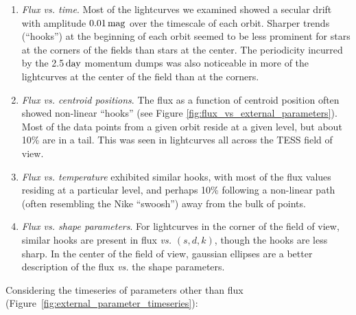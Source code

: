 \documentclass[12pt,twocolumn,tighten]{aastex62}
\begin{document}
\begin{enumerate}

\item {\it Flux vs. time}. Most of the lightcurves we examined showed a secular
    drift with amplitude $0.01\,{\rm mag}$ over the timescale of each
    orbit.  Sharper trends (``hooks'') at the beginning of each orbit
    seemed to be less prominent for stars at the corners of the fields
    than stars at the center.  The periodicity incurred by the
    2.5$\,{\rm day}$ momentum dumps was also noticeable in more of the
    lightcurves at the center of the field than at the corners.

\item {\it Flux vs. centroid positions}. The flux as a function of
  centroid position often showed non-linear ``hooks'' (see Figure
    \ref{fig:flux_vs_external_parameters}). Most of the data points from a 
    given orbit reside at a given
    level, but about 10\% are in a tail. This was seen in lightcurves
    all across the TESS field of view.

\item {\it Flux vs. temperature} exhibited similar hooks, with most of
  the flux values residing at a particular level, and perhaps 10\%
    following a non-linear path (often resembling the Nike ``swoosh'')
    away from the bulk of points.

\item {\it Flux vs. shape parameters}.  For lightcurves in the corner
  of the field of view, similar hooks are present in flux {\it vs.}
    $(s,d,k)$, though the hooks are less sharp.  In the center of the
    field of view, gaussian ellipses are a better description of the
    flux {\it vs.} the shape parameters.
    
\end{enumerate}

Considering the timeseries of parameters other than flux 
(Figure~\ref{fig:external_parameter_timeseries}):
\end{document}
